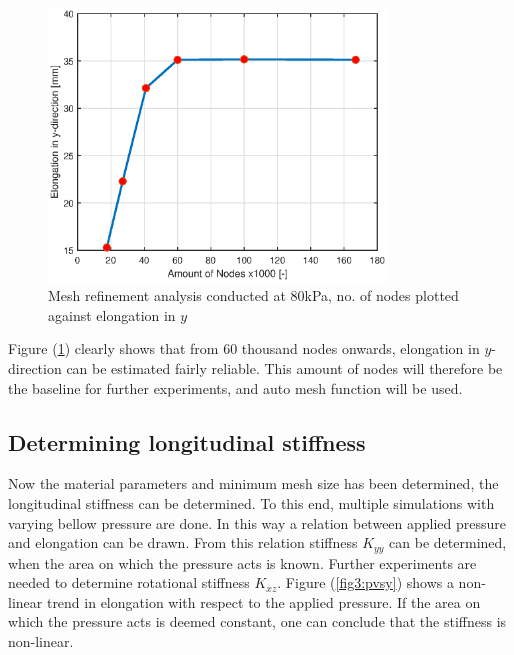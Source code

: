\begin{figure}[H]
    \centering
    \includegraphics[width = 0.8\textwidth]{Figures/Chapter2/MeshRefinement.eps}
    \caption{Mesh refinement analysis conducted at 80kPa, no. of nodes plotted against elongation in $y$}
    \label{fig3:meshrefinement}
\end{figure}


Figure (\ref{fig3:meshrefinement}) clearly shows that from 60 thousand nodes onwards, elongation in $y$-direction can be estimated fairly reliable. This amount of nodes will therefore be the baseline for further experiments, and auto mesh function will be used.



\subsection{Determining longitudinal stiffness}
Now the material parameters and minimum mesh size has been determined, the longitudinal stiffness can be determined. To this end, multiple simulations with varying bellow pressure are done. In this way a relation between applied pressure and elongation can be drawn. From this relation stiffness $K_{yy}$ can be determined, when the area on which the pressure acts is known. Further experiments are needed to determine rotational stiffness $K_{xz}$. Figure (\ref{fig3:pvsy}) shows a non-linear trend in elongation with respect to the applied pressure. If the area on which the pressure acts is deemed constant, one can conclude that the stiffness is non-linear.


